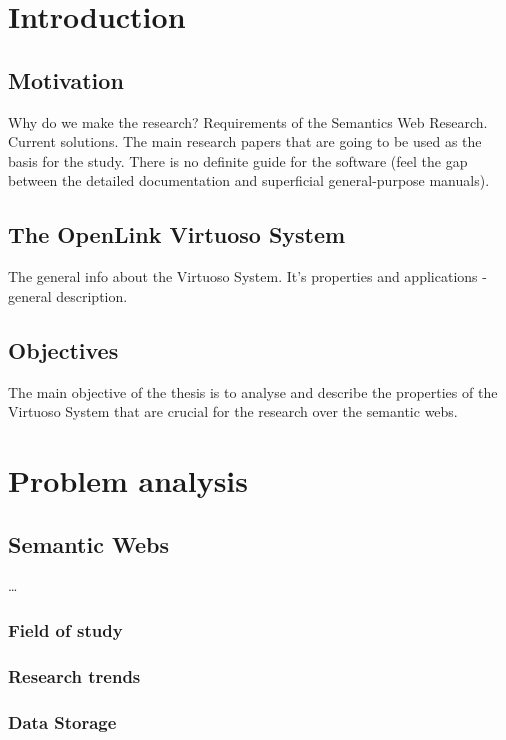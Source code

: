 \chapter{Introduction}

\section{Motivation}
Why do we make the research? 
Requirements of the Semantics Web Research. 
Current solutions. 
The main research papers that are going to be used as the basis for the study.
There is no definite guide for the software (feel the gap between the detailed
documentation and superficial general-purpose manuals).

\section{The OpenLink Virtuoso System}
The general info about the Virtuoso System. It's properties and applications -
general description.

\section{Objectives}
\label{sec:Objectives}
The main objective of the thesis\cite{6079245} is to analyse and describe the
properties of the Virtuoso System that are crucial for the research over the
semantic webs.

\chapter{Problem analysis}
\label{chap:Problemanalysis}

\section{Semantic Webs}
\ldots

\subsection{Field of study}

\subsection{Research trends}

\subsection{Data Storage}

